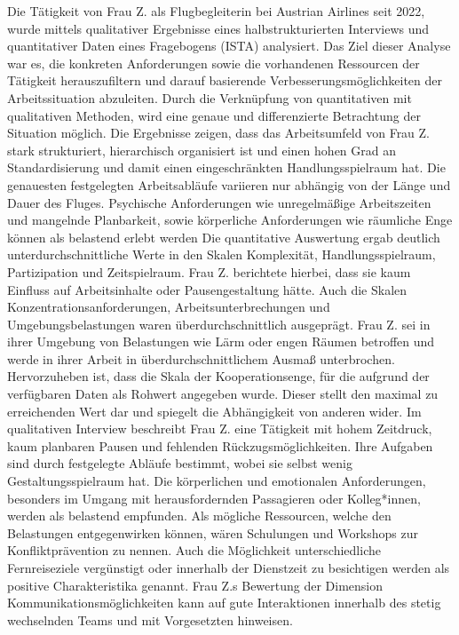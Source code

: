 \documentclass[12pt, a4paper]{article}
\begin{document}
Die Tätigkeit von Frau Z. als Flugbegleiterin bei Austrian Airlines seit 2022, wurde mittels qualitativer Ergebnisse eines 
halbstrukturierten Interviews und quantitativer Daten eines Fragebogens (ISTA) analysiert.
Das Ziel dieser Analyse war es, die konkreten Anforderungen sowie die vorhandenen Ressourcen der Tätigkeit herauszufiltern 
und darauf basierende Verbesserungsmöglichkeiten der Arbeitssituation abzuleiten.
Durch die Verknüpfung von quantitativen mit qualitativen Methoden, wird eine genaue und differenzierte Betrachtung der Situation möglich.
Die Ergebnisse zeigen, dass das Arbeitsumfeld von Frau Z. stark strukturiert, hierarchisch organisiert ist und einen hohen Grad 
an Standardisierung und damit einen eingeschränkten Handlungsspielraum hat. Die genauesten festgelegten Arbeitsabläufe 
variieren nur abhängig von der Länge und Dauer des Fluges. Psychische Anforderungen wie unregelmäßige Arbeitszeiten und mangelnde Planbarkeit, 
sowie körperliche Anforderungen wie räumliche Enge können als belastend erlebt werden
Die quantitative Auswertung ergab deutlich unterdurchschnittliche Werte in den Skalen Komplexität, Handlungsspielraum, 
Partizipation und Zeitspielraum. Frau Z. berichtete hierbei, dass sie kaum Einfluss auf Arbeitsinhalte oder Pausengestaltung hätte. 
Auch die Skalen Konzentrationsanforderungen, Arbeitsunterbrechungen und Umgebungsbelastungen waren überdurchschnittlich ausgeprägt. 
Frau Z. sei in ihrer Umgebung von Belastungen wie Lärm oder engen Räumen betroffen und werde in ihrer Arbeit in überdurchschnittlichem 
Ausmaß unterbrochen. Hervorzuheben ist, dass die Skala der Kooperationsenge, für die aufgrund der verfügbaren Daten als Rohwert angegeben wurde.
Dieser stellt den maximal zu erreichenden Wert dar und spiegelt die Abhängigkeit von anderen wider.
Im qualitativen Interview beschreibt Frau Z. eine Tätigkeit mit hohem Zeitdruck, kaum planbaren Pausen und fehlenden Rückzugsmöglichkeiten.
Ihre Aufgaben sind durch festgelegte Abläufe bestimmt, wobei sie selbst wenig Gestaltungsspielraum hat. 
Die körperlichen und emotionalen Anforderungen, besonders im Umgang mit herausfordernden Passagieren oder Kolleg*innen, 
werden als belastend empfunden.
Als mögliche Ressourcen, welche den Belastungen entgegenwirken können, wären Schulungen und Workshops zur Konfliktprävention zu nennen. 
Auch die Möglichkeit unterschiedliche Fernreiseziele vergünstigt oder innerhalb der Dienstzeit zu besichtigen werden 
als positive Charakteristika genannt. Frau Z.s Bewertung der Dimension Kommunikationsmöglichkeiten kann auf gute Interaktionen 
innerhalb des stetig wechselnden Teams und mit Vorgesetzten hinweisen.
\end{document}

